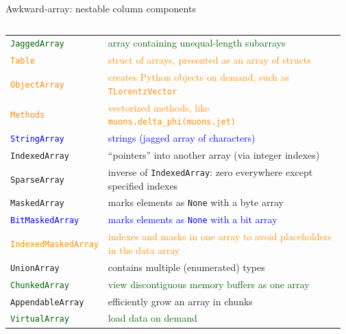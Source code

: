 \documentclass[aspectratio=169]{beamer}
\begin{document}
\begin{frame}{Awkward-array: nestable column components}
\vspace{0.35 cm}
\begin{columns}
\begin{tabular}{p{0.26\linewidth} p{0.71\linewidth}}
\textcolor{darkgreen}{\texttt{JaggedArray}}        & \textcolor{darkgreen}{array containing unequal-length subarrays} \\
\textcolor{darkorange}{\texttt{Table}}                & \textcolor{darkorange}{struct of arrays, presented as an array of structs} \\
\textcolor{darkorange}{\texttt{ObjectArray}}          & \textcolor{darkorange}{creates Python objects on demand, such as \texttt{TLorentzVector}} \\
\textcolor{darkorange}{\texttt{Methods}}              & \textcolor{darkorange}{vectorized methods, like \texttt{muons.delta_phi(muons.jet)}} \\
\textcolor{blue}{\texttt{StringArray}}         & \textcolor{blue}{strings (jagged array of characters)} \\
\texttt{IndexedArray}                          & ``pointers'' into another array (via integer indexes) \\
\texttt{SparseArray}                           & inverse of {\tt IndexedArray}: zero everywhere except specified indexes \\
\texttt{MaskedArray}                           & marks elements as {\tt None} with a byte array \\
\textcolor{blue}{\texttt{BitMaskedArray}}      & \textcolor{blue}{marks elements as {\tt None} with a bit array} \\
\textcolor{darkorange}{\texttt{IndexedMaskedArray}}   & \textcolor{darkorange}{indexes and masks in one array to avoid placeholders in the data array} \\
\texttt{UnionArray}                            & contains multiple (enumerated) types \\
\textcolor{darkgreen}{\texttt{ChunkedArray}}       & \textcolor{darkgreen}{view discontiguous memory buffers as one array} \\
\texttt{AppendableArray}                       & efficiently grow an array in chunks \\
\textcolor{darkgreen}{\texttt{VirtualArray}}       & \textcolor{darkgreen}{load data on demand} \\
\end{tabular}


\end{columns}
\end{frame}
\end{document}
